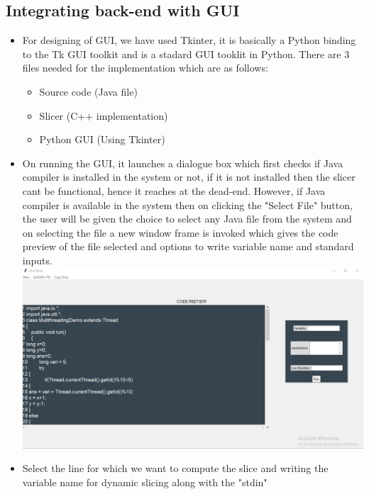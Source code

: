 \documentclass[conference]{IEEEtran}
\begin{document}
\subsection{Integrating back-end with GUI}
\begin{itemize}
\item For designing of GUI, we have used Tkinter, it is basically a Python binding to the Tk GUI toolkit and is a stadard GUI tooklit in Python. There are 3 files needed for the implementation which are as follows:
\begin{itemize}
    \item Source code (Java file)
    \item Slicer (C++ implementation)
    \item Python GUI (Using Tkinter)
\end{itemize}
\vspace{0.5 cm}
\item On running the GUI, it launches a dialogue box which first checks if Java compiler is installed in the system or not, if it is not installed then the slicer cant be functional, hence it reaches at the dead-end. However, if Java compiler is available in the system then on clicking the "Select File" button, the user will be given the choice to select any Java file from the system and on selecting the file a new window frame is invoked which gives the code preview of the file selected and options to write variable name and standard inputs.\\


\vspace{0.25 cm}
\includegraphics[scale=0.2]{UI_1.jpg}\\
\vspace{0.5 cm}
\item Select the line for which we want to compute the slice and writing the variable name for dynamic slicing along with the "stdin"\\



\end{itemize}
\end{document}
